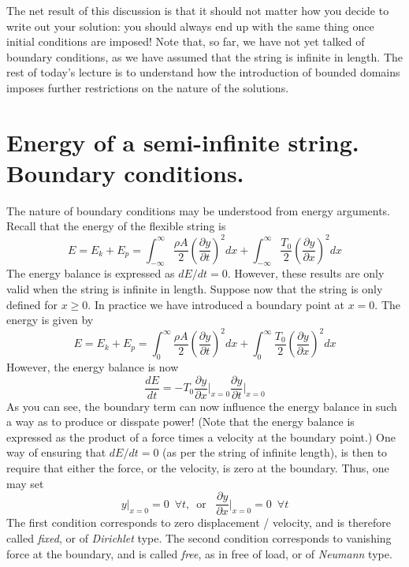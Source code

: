 \documentclass[11pt,twoside,a4paper,english]{book}
\begin{document}
\medskip \medskip 

\noindent
The net result of this discussion is that it should not matter how you decide to write out your solution: you should always end up with the same thing once initial conditions are imposed! Note that, so far, we have not yet talked of boundary conditions, as we have assumed that the string is infinite in length. The rest of today's lecture is to understand how the introduction of bounded domains imposes further restrictions on the nature of the solutions. 



\section{Energy of a semi-infinite string. Boundary conditions.}\label{sec:WaveEquationsBCs}



The nature of boundary conditions may be understood from energy arguments. Recall  that the energy of the flexible string is 
\begin{equation}
E = E_k + E_p = \int_{-\infty}^{\infty} \frac{\rho A}{2}\left( \frac{\partial y}{\partial t} \right)^2 dx + \int_{-\infty}^{\infty} \frac{T_0}{2}\left( \frac{\partial y}{\partial x} \right)^2 dx
\end{equation}
The energy balance is expressed as $dE/dt = 0$. However, these results are only valid when the string is infinite in length. Suppose now that the string is only defined for $x\geq 0$. In practice we have introduced a boundary point at $x=0.$ The energy is given by
\begin{equation}\label{eq:EnHalf}
E = E_k + E_p = \int_{0}^{\infty} \frac{\rho A}{2}\left( \frac{\partial y}{\partial t} \right)^2 dx + \int_{0}^{\infty} \frac{T_0}{2}\left( \frac{\partial y}{\partial x} \right)^2 dx
\end{equation}
However, the energy balance is now
\begin{equation}\label{eq:EnBal}
\frac{dE}{dt} = - T_0 \frac{\partial y}{\partial x }\Bigg|_{x=0}\frac{\partial y}{\partial t }\Bigg|_{x=0}
\end{equation}
As you can see, the boundary term can now influence the energy balance in such a way as to produce or disspate power! (Note that the energy balance is expressed as the product of a force times a velocity at the boundary point.) One way of ensuring that $dE/dt = 0$ (as per the string of infinite length), is then to require that either the force, or the velocity, is zero at the boundary. Thus, one may set
\begin{equation}
y\big|_{x=0} = 0 \,\,\, \forall t, \,\,\, \text{or } \,\,\, \frac{\partial y}{\partial x }\Bigg|_{x=0} = 0 \,\,\, \forall t
\end{equation}
The first condition corresponds to zero displacement / velocity, and is therefore called \emph{fixed}, or of \emph{Dirichlet} type. The second condition corresponds to vanishing force at the boundary, and is called \emph{free}, as in free of load, or of \emph{Neumann} type. 
\medskip \medskip 
\end{document}

